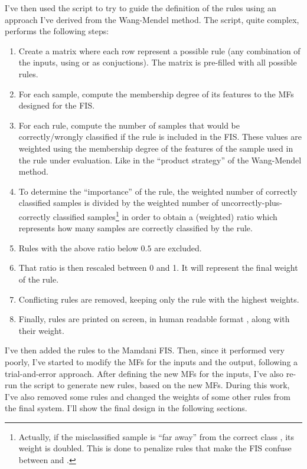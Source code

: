 I've then used the script  to try to guide the definition of
the rules using an approach I've derived from the Wang-Mendel method. The
script, quite complex, performs the following steps:
\begin{enumerate}
	\item Create a matrix where each row represent a possible rule (any
		combination of the inputs, using  or  as
		conjuctions). The matrix is pre-filled with all possible rules.
	\item For each sample, compute the membership degree of its features to
		the MFs designed for the FIS.
	\item For each rule, compute the number of samples that would be
		correctly/wrongly classified if the rule is included in the
		FIS. These values are weighted using the membership degree of
		the features of the sample used in the rule under evaluation.
		Like in the ``product strategy'' of the Wang-Mendel method.
	\item To determine the ``importance'' of the rule, the weighted number
		of correctly classified samples is divided by the weighted
		number of uncorrectly-plus-correctly classified
		samples\footnote{Actually, if the misclassified sample is ``far
		away'' from the correct class , its weight is doubled. This is done to penalize
		rules that make the FIS confuse between  and
		.} in order to obtain a (weighted) ratio which
		represents how many samples are correctly classified by the
		rule.
	\item Rules with the above ratio below \(0.5\) are excluded.
	\item That ratio is then rescaled between 0 and 1. It will represent
		the final weight of the rule.
	\item Conflicting rules  are removed, keeping only the rule with the
		highest weights.
	\item Finally, rules are printed on screen, in human readable format
		, along with their weight.
\end{enumerate}

I've then added the rules to the Mamdani FIS. Then, since it performed very
poorly, I've started to modify the MFs for the inputs and the output, following
a trial-and-error approach. After defining the new MFs for the inputs, I've
also re-run the  script to generate new rules, based on the
new MFs. During this work, I've also removed some rules and changed the weights
of some other rules from the final system. I'll show the final design in the
following sections.


